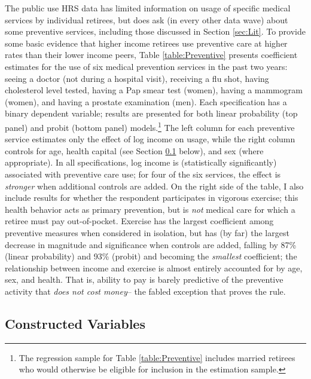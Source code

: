 \documentclass[12pt,pdftex,letterpaper]{article}
\begin{document}
The public use HRS data has limited information on usage of specific medical services by individual retirees, but does ask (in every other data wave) about some preventive services, including those discussed in Section \ref{sec:Lit}.  To provide some basic evidence that higher income retirees use preventive care at higher rates than their lower income peers, Table \ref{table:Preventive} presents coefficient estimates for the use of six medical prevention services in the past two years: seeing a doctor (not during a hospital visit), receiving a flu shot, having cholesterol level tested, having a Pap smear test (women), having a mammogram (women), and having a prostate examination (men). Each specification has a binary dependent variable; results are presented for both linear probability (top panel) and probit (bottom panel) models.\footnote{The regression sample for Table \ref{table:Preventive} includes married retirees who would otherwise be eligible for inclusion in the estimation sample.}  The left column for each preventive service estimates only the effect of log income on usage, while the right column controls for age, health capital (see Section \ref{sec:Constructions} below), and sex (where appropriate).  In all specifications, log income is (statistically significantly) associated with preventive care use; for four of the six services, the effect is \textit{stronger} when additional controls are added.  On the right side of the table, I also include results for whether the respondent participates in vigorous exercise; this health behavior acts as primary prevention, but is \textit{not} medical care for which a retiree must pay out-of-pocket.  Exercise has the largest coefficient among preventive measures when considered in isolation, but has (by far) the largest decrease in magnitude and significance when controls are added, falling by 87\% (linear probability) and 93\% (probit) and becoming the \textit{smallest} coefficient; the relationship between income and exercise is almost entirely accounted for by age, sex, and health. That is, ability to pay is barely predictive of the preventive activity that \textit{does not cost money}-- the fabled exception that proves the rule.


\subsection{Constructed Variables}
\label{sec:Constructions}
\end{document}
